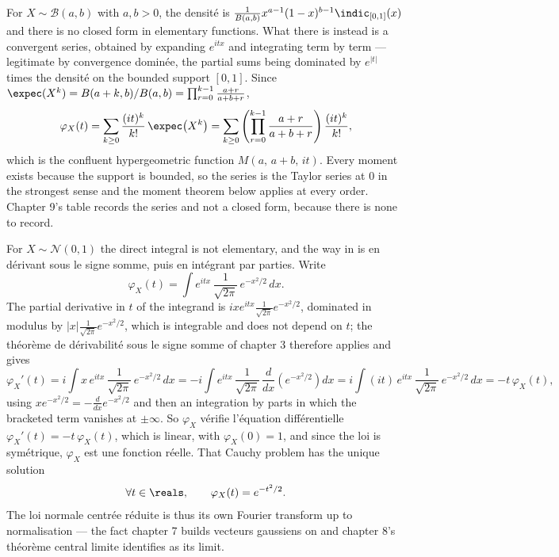 \begin{example}
For $X \sim \mathcal{B}(a,b)$ with $a, b > 0$, the densité is
$\frac{1}{B(a,b)}x^{a-1}(1-x)^{b-1}\indic_{[0,1]}(x)$ and there is no closed form in
elementary functions. What there is instead is a convergent series, obtained by expanding
$e^{itx}$ and integrating term by term --- legitimate by convergence dominée, the partial
sums being dominated by $e^{|t|}$ times the densité on the bounded support $[0,1]$. Since
$\expec(X^{k}) = B(a+k,b)/B(a,b) = \prod_{r=0}^{k-1}\frac{a+r}{a+b+r}$,
\[
  \varphi_{X}(t) = \sum_{k \geq 0} \frac{(it)^{k}}{k!}\,\expec\!\left(X^{k}\right) = \sum_{k
  \geq 0} \left(\prod_{r=0}^{k-1}\frac{a+r}{a+b+r}\right)\frac{(it)^{k}}{k!},
\]
which is the confluent hypergeometric function $M(a,\,a+b,\,it)$. Every moment exists
because the support is bounded, so the series is the Taylor series at $0$ in the strongest
sense and the moment theorem below applies at every order. Chapter 9's table records the
series and not a closed form, because there is none to record.
\end{example}

\begin{example}
For $X \sim \mathcal{N}(0,1)$ the direct integral is not elementary, and the way in is en
dérivant sous le signe somme, puis en intégrant par parties. Write
\[
  \varphi_{X}(t) = \int e^{itx}\,\frac{1}{\sqrt{2\pi}}\,e^{-x^{2}/2}\,dx.
\]
The partial derivative in $t$ of the integrand is
$ixe^{itx}\frac{1}{\sqrt{2\pi}}e^{-x^{2}/2}$, dominated in modulus by
$|x|\frac{1}{\sqrt{2\pi}}e^{-x^{2}/2}$, which is integrable and does not depend on $t$; the
théorème de dérivabilité sous le signe somme of chapter 3 therefore applies and gives
\[
  \varphi_{X}'(t) = i\int x\,e^{itx}\,\frac{1}{\sqrt{2\pi}}\,e^{-x^{2}/2}\,dx = -i\int
  e^{itx}\,\frac{1}{\sqrt{2\pi}}\,\frac{d}{dx}\!\left(e^{-x^{2}/2}\right)dx = i\int
  (it)\,e^{itx}\,\frac{1}{\sqrt{2\pi}}\,e^{-x^{2}/2}\,dx = -t\,\varphi_{X}(t),
\]
using $x e^{-x^{2}/2} = -\frac{d}{dx}e^{-x^{2}/2}$ and then an integration by parts in
which the bracketed term vanishes at
$\pm\infty$. So $\varphi_{X}$ vérifie l'équation différentielle $\varphi_{X}'(t) =
-t\,\varphi_{X}(t)$, which is linear, with $\varphi_{X}(0) = 1$, and since the loi is
symétrique, $\varphi_{X}$ est une fonction réelle. That Cauchy problem has the unique solution
\[
  \forall t \in \reals, \qquad \varphi_{X}(t) = e^{-t^{2}/2}.
\]
The loi normale centrée réduite is thus its own Fourier transform up to normalisation --- the
fact chapter 7 builds vecteurs gaussiens on and chapter 8's théorème central limite identifies
as its limit.
\end{example}

